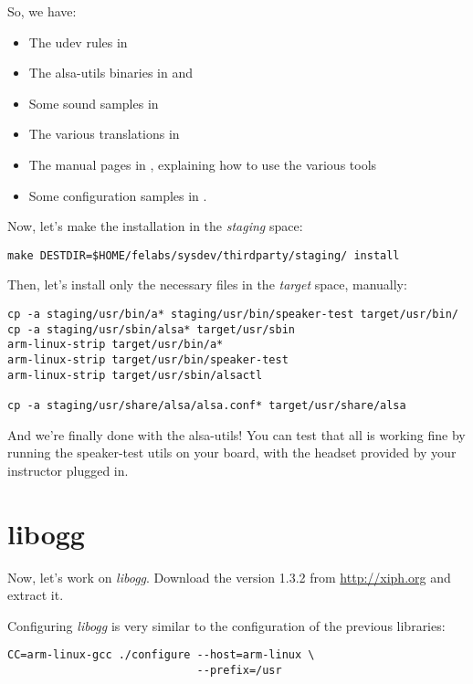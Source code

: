 So, we have:
\begin{itemize}
\item The udev rules in 
\item The alsa-utils binaries in  and 
\item Some sound samples in 
\item The various translations in 
\item The manual pages in , explaining how to
  use the various tools
\item Some configuration samples in .
\end{itemize}

Now, let's make the installation in the {\em staging} space:

\begin{verbatim}
make DESTDIR=$HOME/felabs/sysdev/thirdparty/staging/ install
\end{verbatim}

Then, let's install only the necessary files in the {\em target}
space, manually:

\begin{verbatim}
cp -a staging/usr/bin/a* staging/usr/bin/speaker-test target/usr/bin/
cp -a staging/usr/sbin/alsa* target/usr/sbin
arm-linux-strip target/usr/bin/a*
arm-linux-strip target/usr/bin/speaker-test
arm-linux-strip target/usr/sbin/alsactl

cp -a staging/usr/share/alsa/alsa.conf* target/usr/share/alsa
\end{verbatim}

And we're finally done with the alsa-utils! You can test that all is
working fine by running the speaker-test utils on your board, with the
headset provided by your instructor plugged in.

\section{libogg}

Now, let's work on {\em libogg}. Download the version 1.3.2 from
\url{http://xiph.org} and extract it.

Configuring {\em libogg} is very similar to the configuration of the
previous libraries:

\begin{verbatim}
CC=arm-linux-gcc ./configure --host=arm-linux \
                             --prefix=/usr
\end{verbatim}


